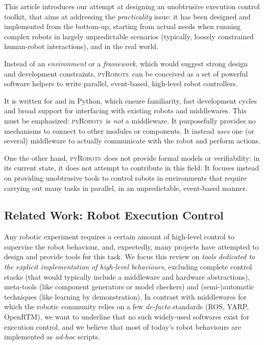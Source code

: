 \documentclass[a4paper, 10pt, conference]{ieeeconf}      %
\newcommand{\pyRobots}{\textsc{pyRobots}\ }
\begin{document}
This article introduces our attempt at designing an unobtrusive execution control
toolkit, that aims at addressing the \emph{practicality} issue: it has been
designed and implemented from the bottom-up, starting from actual needs when
running complex robots in largely unpredictable scenarios (typically,
loosely constrained human-robot interactions), and in the real world.

Instead of an \emph{environment} or a \emph{framework}, which would suggest
strong design and development constraints, \pyRobots can be conceived as a set of
powerful software helpers to write parallel, event-based, high-level robot
controllers.

It is written for and in Python, which ensure familiarity, fast development
cycles and broad support for interfacing with existing robots and middlewares.
This must be emphasized: \pyRobots is \emph{not} a middleware. It purposefully
provides no mechanisms to connect to other modules or components. It instead
\emph{uses} one (or several) middleware to actually communicate with the robot
and perform actions.

One the other hand, \pyRobots does not provide formal models or verifiability:
in its current state, it does not attempt to contribute in this field. It
focuses instead on providing unobtrusive tools to control robots in environments
that require carrying out many tasks in parallel, in an unpredictable,
event-based manner.

\subsection{Related Work: Robot Execution Control}

Any robotic experiment requires a certain amount of high-level control to
supervise the robot behaviour, and, expectedly, many projects have attempted to
design and provide tools for this task.  We focus this review on \emph{tools
dedicated to the explicit implementation of high-level behaviours}, excluding
complete control stacks (that would typically include a middleware and hardware
abstractions), meta-tools (like component generators or model checkers) and
(semi-)automatic techniques (like learning by demonstration).  In contrast with
middlewares for which the robotic community relies on a few \emph{de-facto}
standards (ROS, YARP, OpenRTM), we want to underline that no such widely-used
softwares exist for execution control, and we believe that most of today's robot
behaviours are implemented as \emph{ad-hoc} scripts.
\end{document}
